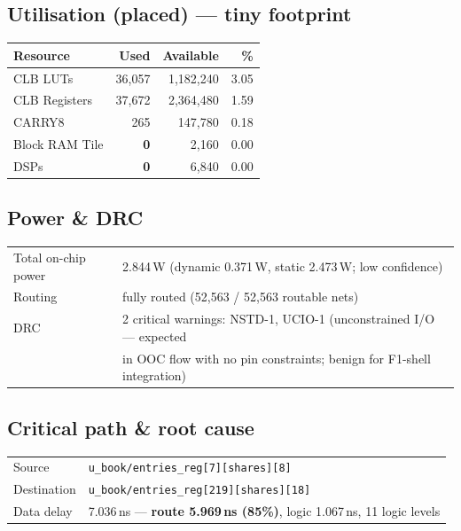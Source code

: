 \documentclass[10pt,a4paper]{article}
\begin{document}
\subsection*{Utilisation (placed) --- tiny footprint}
\begin{center}
\renewcommand{\arraystretch}{1.2}
\begin{tabular}{@{}l r r r@{}}
\toprule
\textbf{Resource} & \textbf{Used} & \textbf{Available} & \textbf{\%} \\
\midrule
CLB LUTs        & 36{,}057 & 1{,}182{,}240 & 3.05 \\
CLB Registers   & 37{,}672 & 2{,}364{,}480 & 1.59 \\
CARRY8          &    265   &   147{,}780  & 0.18 \\
Block RAM Tile  &      \textbf{0} &     2{,}160 & 0.00 \\
DSPs            &      \textbf{0} &     6{,}840 & 0.00 \\
\bottomrule
\end{tabular}
\end{center}

\subsection*{Power \& DRC}
\begin{center}
\renewcommand{\arraystretch}{1.15}
\begin{tabular}{@{}l l@{}}
\toprule
Total on-chip power & 2.844\,W (dynamic 0.371\,W, static 2.473\,W; low confidence) \\
Routing             & fully routed (52{,}563 / 52{,}563 routable nets) \\
DRC                 & 2 critical warnings: NSTD-1, UCIO-1 (unconstrained I/O --- expected \\
                    & \quad in OOC flow with no pin constraints; benign for F1-shell integration) \\
\bottomrule
\end{tabular}
\end{center}

\subsection*{Critical path \& root cause}
\begin{center}
\small
\begin{tabular}{@{}l l@{}}
\toprule
Source       & \texttt{u\_book/entries\_reg[7][shares][8]} \\
Destination  & \texttt{u\_book/entries\_reg[219][shares][18]} \\
Data delay   & 7.036\,ns --- \textbf{route 5.969\,ns (85\%)}, logic 1.067\,ns, 11 logic levels \\
\bottomrule
\end{tabular}
\end{center}
\end{document}
